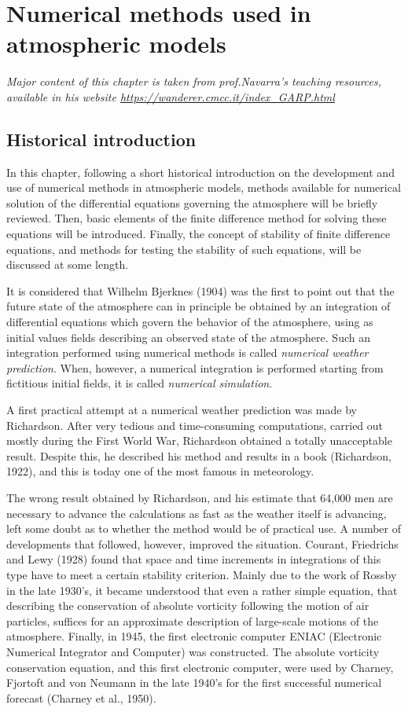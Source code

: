 \chapter{Numerical methods used in atmospheric models}\label{ch:chapter3}
\begin{center}
    \textit{Major content of this chapter is taken from prof.Navarra's teaching resources, available in his website \url{https://wanderer.cmcc.it/index_GARP.html}}
\end{center}
\section{Historical introduction}
In this chapter, following a short historical introduction on the development and use of numerical methods in atmospheric models, methods available for numerical solution of the differential equations governing the atmosphere will be briefly reviewed. Then, basic elements of the finite difference method for solving these equations will be introduced. Finally, the concept of stability of finite difference equations, and methods for testing the stability of such equations, will be discussed at some length.

It is considered that Wilhelm Bjerknes (1904) was the first to point out that the future state of the atmosphere can in principle be obtained by an integration of differential equations which govern the behavior of the atmosphere, using as initial values fields describing an observed state of the atmosphere. Such an integration performed using numerical methods is called \textit{numerical weather prediction}. When, however, a numerical integration is performed starting from fictitious initial fields, it is called \textit{numerical simulation}.

A first practical attempt at a numerical weather prediction was made by Richardson. After very tedious and time-consuming computations, carried out mostly during the First World War, Richardson obtained a totally unacceptable result. Despite this, he described his method and results in a book (Richardson, 1922), and this is today one of the most famous in meteorology.

The wrong result obtained by Richardson, and his estimate that 64,000 men are necessary to advance the calculations as fast as the weather itself is advancing, left some doubt as to whether the method would be of practical use. A number of developments that followed, however, improved the situation. Courant, Friedrichs and Lewy (1928) found that space and time increments in integrations of this type have to meet a certain stability criterion. Mainly due to the work of Rossby in the late 1930’s, it became understood that even a rather simple equation, that describing the conservation of absolute vorticity following the motion of air particles, suffices for an approximate description of large-scale motions of the atmosphere. Finally, in 1945, the first electronic computer ENIAC (Electronic Numerical Integrator and Computer) was constructed. The absolute vorticity conservation equation, and this first electronic computer, were used by Charney, Fjortoft and von Neumann in the late 1940’s for the first successful numerical forecast (Charney et al., 1950).

